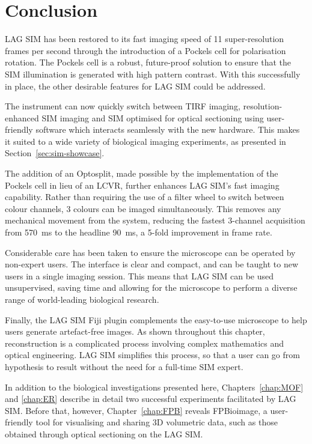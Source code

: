 \section{Conclusion}
LAG SIM has been restored to its fast imaging speed of 11 super-resolution frames per second through the introduction of a Pockels cell for polarisation rotation.
The Pockels cell is a robust, future-proof solution to ensure that the SIM illumination is generated with high pattern contrast.
With this successfully in place, the other desirable features for LAG SIM could be addressed.

The instrument can now quickly switch between TIRF imaging, resolution-enhanced SIM imaging and SIM optimised for optical sectioning using user-friendly software which interacts seamlessly with the new hardware.
This makes it suited to a wide variety of biological imaging experiments, as presented in Section~\ref{sec:sim-showcase}.

The addition of an Optosplit, made possible by the implementation of the Pockels cell in lieu of an LCVR, further enhances LAG SIM's fast imaging capability.
Rather than requiring the use of a filter wheel to switch between colour channels, 3 colours can be imaged simultaneously.
This removes any mechanical movement from the system, reducing the fastest 3-channel acquisition from \SI{570}{\milli\second} to the headline \SI{90}{\milli\second}, a 5-fold improvement in frame rate.

Considerable care has been taken to ensure the microscope can be operated by non-expert users.
The interface is clear and compact, and can be taught to new users in a single imaging session.
This means that LAG SIM can be used unsupervised, saving time and allowing for the microscope to perform a diverse range of world-leading biological research.

Finally, the LAG SIM Fiji plugin complements the easy-to-use microscope to help users generate artefact-free images.
As shown throughout this chapter, reconstruction is a complicated process involving complex mathematics and optical engineering.
LAG SIM simplifies this process, so that a user can go from hypothesis to result without the need for a full-time SIM expert.

In addition to the biological investigations presented here, Chapters~\ref{chap:MOF} and \ref{chap:ER} describe in detail two successful experiments facilitated by LAG SIM.
Before that, however, Chapter~\ref{chap:FPB} reveals FPBioimage, a user-friendly tool for visualising and sharing 3D volumetric data, such as those obtained through optical sectioning on the LAG SIM.
